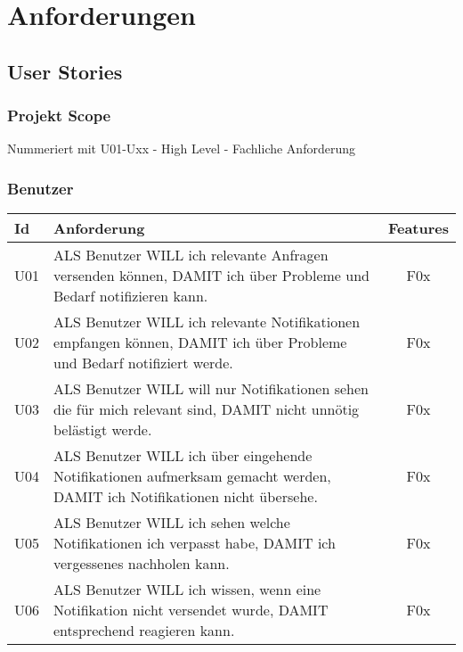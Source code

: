 \section{Anforderungen}\label{sec:anforderungen}

\subsection{User Stories}\label{subsec:user-stories}

\subsubsection*{Projekt Scope}


Nummeriert mit U01-Uxx - High Level - Fachliche Anforderung

\subsubsection*{Benutzer}

\begin{table}[h]
    \centering
    \begin{tabular}{|l|p{13cm}|c|}
        \hline
        \textbf{Id} & \textbf{Anforderung}                                                                                                     & \textbf{Features} \\
        \hline
        U01         & ALS Benutzer WILL ich relevante Anfragen versenden können, DAMIT ich über Probleme und Bedarf notifizieren kann. & F0x \\
        \hline
        U02         & ALS Benutzer WILL ich relevante Notifikationen empfangen können, DAMIT ich über Probleme und Bedarf notifiziert werde. & F0x \\
        \hline
        U03         & ALS Benutzer WILL will nur Notifikationen sehen die für mich relevant sind, DAMIT nicht unnötig belästigt werde. & F0x \\
        \hline
        U04         & ALS Benutzer WILL ich über eingehende Notifikationen aufmerksam gemacht werden, DAMIT ich Notifikationen nicht übersehe. & F0x \\
        \hline
        U05         & ALS Benutzer WILL ich sehen welche Notifikationen ich verpasst habe, DAMIT ich vergessenes nachholen kann. & F0x \\
        \hline
        U06         & ALS Benutzer WILL ich wissen, wenn eine Notifikation nicht versendet wurde, DAMIT entsprechend reagieren kann. & F0x \\
        \hline
    \end{tabular}\label{tab:userstories1}
\end{table}

